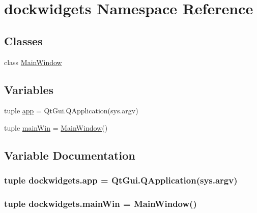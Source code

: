 \hypertarget{namespacedockwidgets}{}\section{dockwidgets Namespace Reference}
\label{namespacedockwidgets}
\subsection*{Classes}
\begin{DoxyCompactItemize}
\item 
class \hyperlink{classdockwidgets_1_1MainWindow}{Main\+Window}
\end{DoxyCompactItemize}
\subsection*{Variables}
\begin{DoxyCompactItemize}
\item 
tuple \hyperlink{namespacedockwidgets_a558ae940f95c12e1fa18271dc620a409}{app} = Qt\+Gui.\+Q\+Application(sys.\+argv)
\item 
tuple \hyperlink{namespacedockwidgets_ab4308e81e925e3825629d0a48835a5ba}{main\+Win} = \hyperlink{classdockwidgets_1_1MainWindow}{Main\+Window}()
\end{DoxyCompactItemize}


\subsection{Variable Documentation}
\hypertarget{namespacedockwidgets_a558ae940f95c12e1fa18271dc620a409}{}
\subsubsection[{app}]{\setlength{\rightskip}{0pt plus 5cm}tuple dockwidgets.\+app = Qt\+Gui.\+Q\+Application(sys.\+argv)}\label{namespacedockwidgets_a558ae940f95c12e1fa18271dc620a409}
\hypertarget{namespacedockwidgets_ab4308e81e925e3825629d0a48835a5ba}{}
\subsubsection[{main\+Win}]{\setlength{\rightskip}{0pt plus 5cm}tuple dockwidgets.\+main\+Win = {\bf Main\+Window}()}\label{namespacedockwidgets_ab4308e81e925e3825629d0a48835a5ba}
